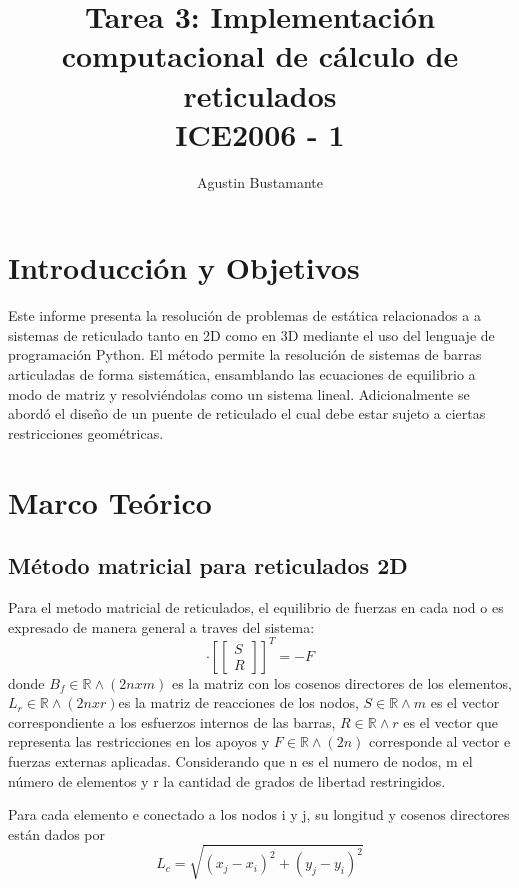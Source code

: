 \documentclass[]{article}
\title{Tarea 3: Implementación computacional de cálculo de reticulados \\ [0.5em] \large ICE2006 - 1}
\author{Agustin Bustamante}
\begin{document}
	
	\maketitle
	
	\newpage
	
	\section{Introducción y Objetivos}
	Este informe presenta la resolución de problemas de estática relacionados a a sistemas de reticulado tanto en 2D como en 3D mediante el uso del lenguaje de programación Python. El método permite la resolución de sistemas de barras articuladas de forma sistemática, ensamblando las ecuaciones de equilibrio a modo de matriz y resolviéndolas como un sistema lineal. Adicionalmente se abordó el diseño de un puente de reticulado el cual debe estar sujeto a ciertas restricciones geométricas.
	\section{Marco Teórico}
	\subsection{Método matricial para reticulados 2D}
	Para el metodo matricial de reticulados, el equilibrio de fuerzas en cada nod o es expresado de manera general a traves del sistema:
	\begin{equation}
		[Bf | Lr] \cdot [\begin{bmatrix}
			S \\ R
		\end{bmatrix}]^T = -F
	\end{equation}
	donde $B_f \in \mathbb{R} \land (2n x m)$ es la matriz con los cosenos directores de los elementos, $L_r \in \mathbb{R} \land (2n x r)$es la matriz de reacciones de los nodos, $S\in \mathbb{R} \land m$ es el vector correspondiente a los esfuerzos internos de las barras, $R\in\mathbb{R} \land r$ es el vector que representa las restricciones en los apoyos y $F\in \mathbb{R} \land (2n)$ corresponde al vector e fuerzas externas aplicadas. Considerando que n es el numero de nodos, m el número de elementos y r la cantidad de grados de libertad restringidos.
	
	Para cada elemento e conectado a los nodos i y j, su longitud y cosenos directores están dados por
	\begin{equation}
		L_c = \sqrt{(x_j - x_i)^2 + (y_j - y_i)^2}
	\end{equation}
	
\end{document}
